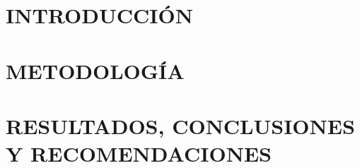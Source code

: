 \chapter{INTRODUCCIÓN}
\label{chapter01:descripcionComponenteDesarrollado}


\chapter{METODOLOGÍA}

% 

%

\chapter{RESULTADOS, CONCLUSIONES Y RECOMENDACIONES}
\label{conclusions}
